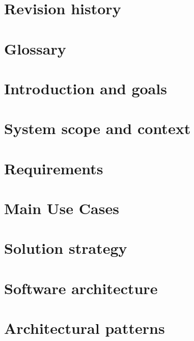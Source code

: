 \documentclass[11pt, oneside]{book}
\begin{document}


\frontmatter

\chapter{Revision history}
\label{chp:rev_his}




\chapter{Glossary}
\label{chp:glos}


\mainmatter

\chapter{Introduction and goals}
\label{chp:intro}


\chapter{System scope and context}
\label{chp:syst_context}


\chapter{Requirements}
\label{chp:requirements}


\chapter{Main Use Cases}
\label{chp:usecases}


\chapter{Solution strategy}
\label{chp:sol_strategy}


\chapter{Software architecture}
\label{chp:soft_arch}


\chapter{Architectural patterns}
\label{chp:patterns}

\end{document}
